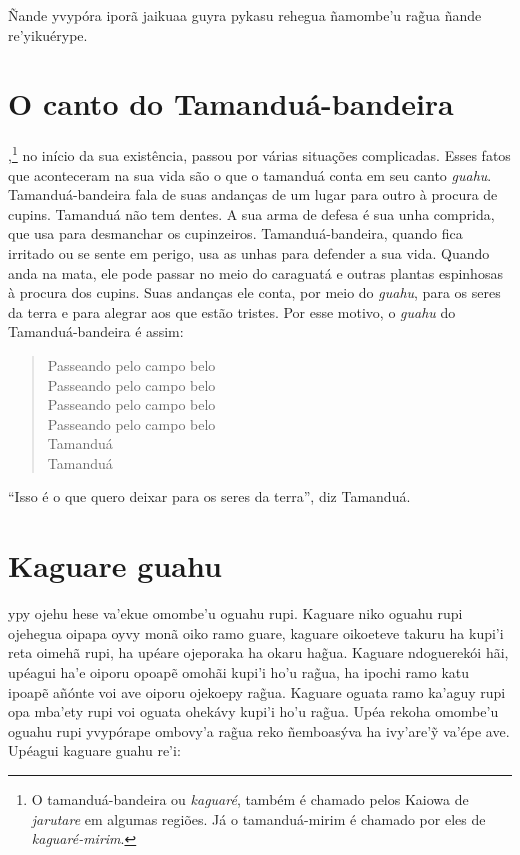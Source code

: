 Ñande yvypóra iporã jaikuaa guyra pykasu rehegua ñamombe'u rag̃ua ñande
re'yikuérype.

\chapter{O canto do Tamanduá-bandeira}

,\footnote{O tamanduá-bandeira ou \textit{kaguaré}, também é chamado pelos Kaiowa de \textit{jarutare} em algumas regiões. Já o tamanduá-mirim é
  chamado por eles de \textit{kaguaré-mirim}.} no início da sua existência, passou por várias
situações complicadas. Esses fatos que aconteceram na sua vida são o que
o tamanduá conta em seu canto \textit{guahu}. Tamanduá-bandeira fala de
suas andanças de um lugar para outro à procura de cupins. Tamanduá não
tem dentes. A sua arma de defesa é sua unha comprida, que usa para
desmanchar os cupinzeiros. Tamanduá-bandeira, quando fica irritado ou se
sente em perigo, usa as unhas para defender a sua vida. Quando anda na
mata, ele pode passar no meio do caraguatá e outras plantas espinhosas à
procura dos cupins. Suas andanças ele conta, por meio do \textit{guahu},
para os seres da terra e para alegrar aos que estão tristes. Por esse
motivo, o \textit{guahu} do Tamanduá-bandeira é assim:

\begin{verse}
Passeando\footnotemark{} pelo campo belo\\
Passeando pelo campo belo\\
Passeando pelo campo belo\\
Passeando pelo campo belo\\
Tamanduá\\
Tamanduá
\end{verse}

``Isso é o que quero deixar para os seres da terra'', diz Tamanduá.


\chapter{Kaguare guahu}

 ypy ojehu hese va'ekue omombe'u
oguahu rupi. Kaguare niko oguahu rupi ojehegua oipapa oyvy monã oiko
ramo guare, kaguare oikoeteve takuru ha kupi'i reta oimehã rupi, ha
upéare ojeporaka ha okaru hag̃ua. Kaguare ndoguerekói hãi, upéagui ha'e
oiporu opoapẽ omohãi kupi'i ho'u rag̃ua, ha ipochi ramo katu ipoapẽ
añónte voi ave oiporu ojekoepy rag̃ua. Kaguare oguata ramo ka'aguy rupi
opa mba'ety rupi voi oguata ohekávy kupi'i ho'u rag̃ua. Upéa rekoha
omombe'u oguahu rupi yvypórape ombovy'a rag̃ua reko ñemboasýva ha
ivy'are'ỹ va'épe ave. Upéagui kaguare guahu re'i:


